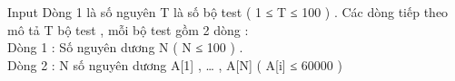 Input
Dòng 1 là số nguyên T là số bộ test ( 1 ≤ T ≤ 100 ) . Các dòng tiếp theo mô tả T bộ test , mỗi bộ test gồm 2 dòng :
\\Dòng 1 : Số nguyên dương N ( N ≤ 100 ) .
\\Dòng 2 : N số nguyên dương A[1] , … , A[N] ( A[i] ≤ 60000 )